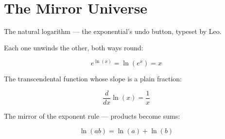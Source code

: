 
\section{The Mirror Universe}

The natural logarithm — the exponential's undo button, typeset by Leo.

Each one unwinds the other, both ways round:

$$ e^{\ln(x)} = \ln\left(e^x\right) = x $$

The transcendental function whose slope is a plain fraction:

$$ \frac{d}{dx} \ln(x) = \frac{1}{x} $$

The mirror of the exponent rule — products become sums:

$$ \ln(ab) = \ln(a) + \ln(b) $$
